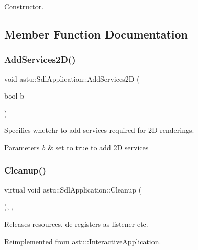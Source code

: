 Constructor. 

\subsection{Member Function Documentation}
\mbox{\label{classastu_1_1SdlApplication_af07d362aa65b3e973c14e05f5079e4cd}} 
\subsubsection{\texorpdfstring{Add\+Services2\+D()}{AddServices2D()}}
{\footnotesize\ttfamily void astu\+::\+Sdl\+Application\+::\+Add\+Services2D (\begin{DoxyParamCaption}\item[{bool}]{b }\end{DoxyParamCaption})}

Specifies whetehr to add services required for 2D renderings.


\begin{DoxyParams}{Parameters}
{\em b} & set to {\ttfamily true} to add 2D services \\
\hline
\end{DoxyParams}
\mbox{\label{classastu_1_1SdlApplication_adbe5cb831451f65b635d37f57bacef3f}} 
\subsubsection{\texorpdfstring{Cleanup()}{Cleanup()}}
{\footnotesize\ttfamily virtual void astu\+::\+Sdl\+Application\+::\+Cleanup (\begin{DoxyParamCaption}{ }\end{DoxyParamCaption})\hspace{0.3cm}{\ttfamily [override]}, {\ttfamily [protected]}, {\ttfamily [virtual]}}

Releases resources, de-\/registers as listener etc. 

Reimplemented from \hyperlink{classastu_1_1InteractiveApplication_a70f5e175ae42b4063358db3787db6bab}{astu\+::\+Interactive\+Application}.

